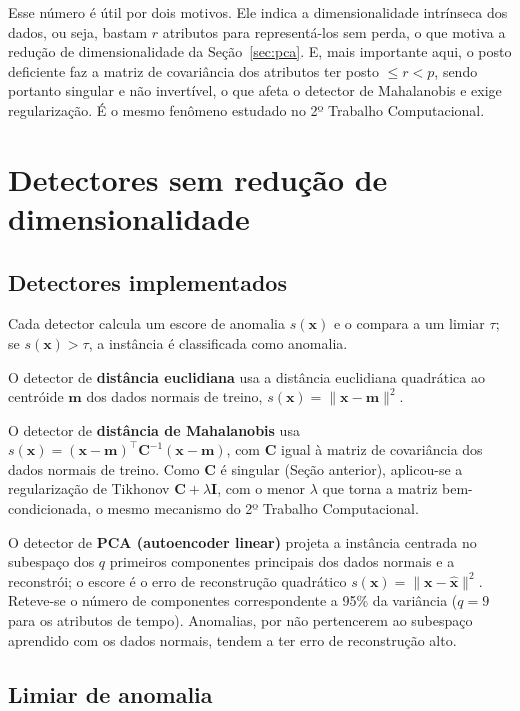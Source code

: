 \documentclass[12pt,a4paper]{scrartcl}
\begin{document}
Esse número é útil por dois motivos. Ele indica a dimensionalidade intrínseca dos dados, ou seja, bastam $r$ atributos para representá-los sem perda, o que motiva a redução de dimensionalidade da Seção~\ref{sec:pca}. E, mais importante aqui, o posto deficiente faz a matriz de covariância dos atributos ter posto $\leq r < p$, sendo portanto singular e não invertível, o que afeta o detector de Mahalanobis e exige regularização. É o mesmo fenômeno estudado no 2º Trabalho Computacional.

\section{Detectores sem redução de dimensionalidade}
\label{sec:detectores}

\subsection{Detectores implementados}

Cada detector calcula um escore de anomalia $s(\mathbf{x})$ e o compara a um limiar $\tau$; se $s(\mathbf{x}) > \tau$, a instância é classificada como anomalia.

O detector de \textbf{distância euclidiana} usa a distância euclidiana quadrática ao centróide $\mathbf{m}$ dos dados normais de treino, $s(\mathbf{x}) = \|\mathbf{x} - \mathbf{m}\|^2$.

O detector de \textbf{distância de Mahalanobis} usa $s(\mathbf{x}) = (\mathbf{x}-\mathbf{m})^{\top}\mathbf{C}^{-1}(\mathbf{x}-\mathbf{m})$, com $\mathbf{C}$ igual à matriz de covariância dos dados normais de treino. Como $\mathbf{C}$ é singular (Seção anterior), aplicou-se a regularização de Tikhonov $\mathbf{C} + \lambda\mathbf{I}$, com o menor $\lambda$ que torna a matriz bem-condicionada, o mesmo mecanismo do 2º Trabalho Computacional.

O detector de \textbf{PCA (autoencoder linear)} projeta a instância centrada no subespaço dos $q$ primeiros componentes principais dos dados normais e a reconstrói; o escore é o erro de reconstrução quadrático $s(\mathbf{x}) = \|\mathbf{x} - \hat{\mathbf{x}}\|^2$. Reteve-se o número de componentes correspondente a 95\% da variância ($q = 9$ para os atributos de tempo). Anomalias, por não pertencerem ao subespaço aprendido com os dados normais, tendem a ter erro de reconstrução alto.

\subsection{Limiar de anomalia}
\end{document}
